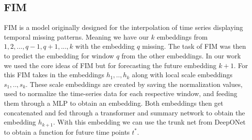 \documentclass{article}
\theoremstyle{plain}
\theoremstyle{definition}
\theoremstyle{remark}
\begin{document}
\subsection{FIM}\label{sec:FIM-l}
FIM\cite{fim-l} is a model originally designed for the interpolation of time series displaying temporal missing patterns. Meaning we have our $k$ embeddings from $1, 2, ..., q-1, q+1, ..., k$ with the embedding $q$ missing. The task of FIM was then to predict the embedding for window $q$ from the other embeddings. In our work we used the core ideas of FIM but for forecasting the future embedding $k+1$. For this FIM takes in the embeddings $h_1, .., h_k$ along with local scale embeddings $s_1, .., s_k$. These scale embeddings are created by saving the normalization values, used to normalize the time-series data for each respective window, and feeding them through a MLP to obtain an embedding. Both embeddings then get concatenated and fed through a transformer and summary network to obtain the embedding $h_{k+1}$. With this embedding we can use the trunk net from DeepONet to obtain a function for future time points $t^*$.
\end{document}
